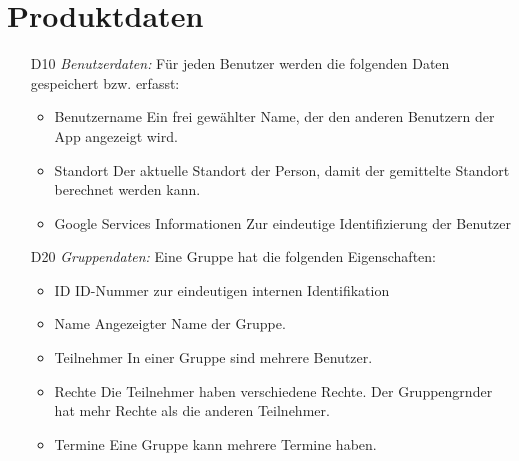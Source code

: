 \documentclass{scrartcl}
\begin{document}
	
	\newpage
	
	
	\section{Produktdaten}
	\begin{itemize}
		\item [D10] \textit{Benutzerdaten:}
		Für jeden Benutzer werden die folgenden Daten gespeichert bzw. erfasst:
		\begin{itemize}
			\item Benutzername
			\newline Ein frei gewählter Name, der den anderen Benutzern der App angezeigt wird.
			\item Standort
			\newline Der aktuelle Standort der Person, damit der gemittelte Standort berechnet werden kann.
			\item Google Services Informationen
			\newline Zur eindeutige Identifizierung der Benutzer
		\end{itemize}
		
		\item [D20] \textit{Gruppendaten:}
		Eine Gruppe hat die folgenden Eigenschaften:
		\begin{itemize}
			\item ID
			\newline ID-Nummer zur eindeutigen internen Identifikation
			\item Name
			\newline Angezeigter Name der Gruppe.
			\item \gls{Teilnehmer}
			\newline In einer Gruppe sind mehrere Benutzer.
			\item Rechte
			\newline Die \gls{Teilnehmer} haben verschiedene Rechte. Der \gls{Gruppengrnder} hat mehr Rechte als die anderen Teilnehmer.
			\item Termine
			\newline Eine Gruppe kann mehrere Termine haben.
		\end{itemize}
		

\end{itemize}
\end{document}
